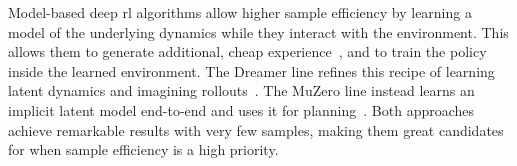 Model-based deep \gls{rl} algorithms allow higher sample efficiency by learning a model of the underlying dynamics
while they interact with the environment.
This allows them to generate additional, cheap experience~\cite{moerland_model-based_2022},
and to train the policy inside the learned environment.
The Dreamer line refines this recipe of learning latent
dynamics and imagining rollouts~\cite{hafner_learning_2019,hafner_mastering_2024}.
The MuZero line instead learns an implicit latent model end-to-end and uses it for planning~\cite{schrittwieser_mastering_2020}.
Both approaches achieve remarkable results with very few samples, making them
great candidates for when sample efficiency is a high priority.
